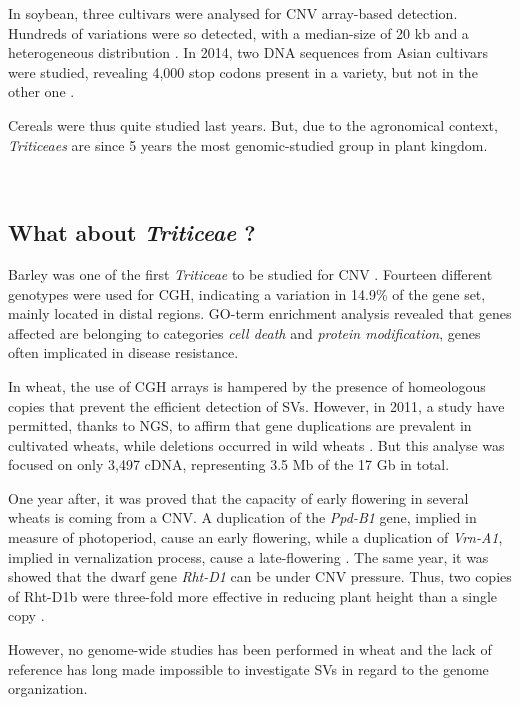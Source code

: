 \documentclass[a4paper, 12pt]{article}
\begin{document}
\begin{onehalfspace}
In soybean, three cultivars were analysed for CNV array-based detection. Hundreds of variations were so detected, with a median-size of 20 kb and a heterogeneous distribution \citep{McHale2012}. In 2014, two DNA sequences from Asian cultivars were studied, revealing 4,000 stop codons present in a variety, but not in the other one \citep{Li2014}.

Cereals were thus quite studied last years. But, due to the agronomical context, \textit{Triticeaes} are since 5 years the most genomic-studied group in plant kingdom.

\newpage %
\thispagestyle{empty}
~
\addtocounter{page}{-1}
\newpage
\clearpage %


        \subsection{What about \textit{Triticeae} ?}
        
Barley was one of the first \textit{Triticeae} to be studied for CNV \citep{Munoz-Amatriain2013}. Fourteen different genotypes were used for CGH, indicating a variation in 14.9\% of the gene set, mainly located in distal regions. GO-term enrichment analysis revealed that genes affected are belonging to categories \textit{cell death} and \textit{protein modification}, genes often implicated in disease resistance.

In wheat, the use of CGH arrays is hampered by the presence of homeologous copies that prevent the efficient detection of SVs. However, in 2011, a study have permitted, thanks to NGS, to affirm that gene duplications are prevalent in cultivated wheats, while deletions occurred in wild wheats \citep{Saintenac2011}. But this analyse was focused on only 3,497 cDNA, representing 3.5 Mb of the 17 Gb in total.

One year after, it was proved that the capacity of early flowering in several wheats is coming from a CNV. A duplication of the \textit{Ppd-B1} gene, implied in measure of photoperiod, cause an early flowering, while a duplication of \textit{Vrn-A1}, implied in vernalization process, cause a late-flowering \citep{Diaz2012}. The same year, it was showed that the dwarf gene \textit{Rht-D1} can be under CNV pressure. Thus, two copies of Rht-D1b were three-fold more effective in reducing plant height than a single copy \citep{Li2012}.

However, no genome-wide studies has been performed in wheat and the lack of reference has long made impossible to investigate SVs in regard to the genome organization.


\end{onehalfspace}
\end{document}
